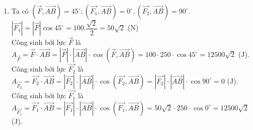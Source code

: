 \begin{bt}
{\begin{enumerate}
\begin{center}
\begin{tikzpicture}[font=\footnotesize, line join=round, line cap=round, >=stealth]
\end{tikzpicture}
\end{center}
Ta có
\begin{eqnarray*}
\overrightarrow{BN}\cdot\overrightarrow{CM}&=&\left(\overrightarrow{AN}-\overrightarrow{AB}\right)\cdot\left(\overrightarrow{AM}-\overrightarrow{AC}\right)\\
&=&\overrightarrow{AN}\cdot\overrightarrow{AM}-\overrightarrow{AN}\cdot\overrightarrow{AC}-\overrightarrow{AB}\cdot\overrightarrow{AM}+\overrightarrow{AC}\cdot\overrightarrow{AB}\\
&=&\left|\overrightarrow{AN}\right|\cdot\left|\overrightarrow{AM}\right|\cdot\cos 60^\circ-\left|\overrightarrow{AN}\right|\cdot\left|\overrightarrow{AC}\right|\cdot\cos 0^\circ-\left|\overrightarrow{AB}\right|\cdot\left|\overrightarrow{AM}\right|\cdot\cos 0^\circ+\\
&&+\left|\overrightarrow{AC}\right|\cdot\left|\overrightarrow{AB}\right|\cdot\cos 60^\circ\\
&=&\dfrac{a}{2}\cdot\dfrac{a}{4}\cdot\cos 60^\circ-\dfrac{a}{4}\cdot a\cdot\cos 0^\circ-a\cdot\dfrac{a}{2}\cdot \cos 0^\circ+a\cdot a\cdot\cos 60^\circ = -\dfrac{3}{16}a^2.\\
\end{eqnarray*}
\item Ta có $\left(\overrightarrow{F},\overrightarrow{AB}\right)=45^\circ ;\left(\overrightarrow{F_1},\overrightarrow{AB}\right)=0^\circ,\left(\overrightarrow{F_2},\overrightarrow{AB}\right)=90^\circ$.\\
$\left|\overrightarrow{F_1}\right|=\left|\overrightarrow{F}\right|\cos 45^\circ=100.\dfrac{\sqrt{2}}{2}=50\sqrt{2}$ (N)\\
Công sinh bởi lực $\overrightarrow{F}$ là \\
$A_{\overrightarrow{F}}=\overrightarrow{F}\cdot \overrightarrow{AB}=\left|\overrightarrow{F}\right|\cdot \left|\overrightarrow{AB}\right|\cdot \cos\left(\overrightarrow{F},\overrightarrow{AB}\right)=100\cdot 250\cdot \cos 45^\circ=12500\sqrt{2}$ (J).\\
Công sinh bởi lực $\overrightarrow{F_2}$ là\\
$A_{\overrightarrow{F_2}}=\overrightarrow{F_2}\cdot\overrightarrow{AB}=\left|\overrightarrow{F_2}\right|\cdot\left|\overrightarrow{AB}\right|\cdot\cos\left(\overrightarrow{F_2},\overrightarrow{AB}\right)=\left|\overrightarrow{F_2}\right|\cdot\left|\overrightarrow{AB}\right|\cdot\cos 90^\circ=0$ (J).\\
Công sinh bởi lực $\overrightarrow{F_1}$ là\\
$A_{\overrightarrow{F_1}}=\overrightarrow{F_1}\cdot\overrightarrow{AB}=\left|\overrightarrow{F_1}\right|\cdot\left|\overrightarrow{AB}\right|\cdot\cos\left(\overrightarrow{F_1},\overrightarrow{AB}\right)=50\sqrt{2}\cdot250\cdot\cos 0^\circ=12500\sqrt{2}$ (J).
\end{enumerate}
}
\end{bt}

